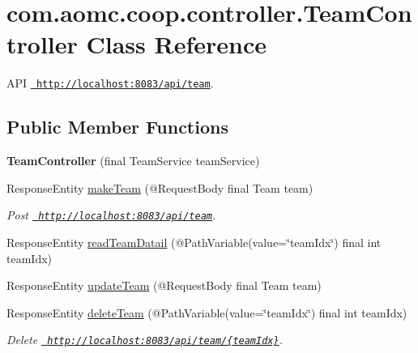 \hypertarget{classcom_1_1aomc_1_1coop_1_1controller_1_1_team_controller}{}\section{com.\+aomc.\+coop.\+controller.\+Team\+Controller Class Reference}
\label{classcom_1_1aomc_1_1coop_1_1controller_1_1_team_controller}


A\+PI \href{http://localhost:8083/api/team}{\texttt{ http\+://localhost\+:8083/api/team}}.  


\subsection*{Public Member Functions}
\begin{DoxyCompactItemize}
\item 
\mbox{\label{classcom_1_1aomc_1_1coop_1_1controller_1_1_team_controller_a128b7d4b135cf66f6615c584ca55a40a}} 
{\bfseries Team\+Controller} (final Team\+Service team\+Service)
\item 
Response\+Entity \mbox{\hyperlink{classcom_1_1aomc_1_1coop_1_1controller_1_1_team_controller_a5ffe7bc4c7dd609d828848bae014440f}{make\+Team}} (@Request\+Body final Team team)
\begin{DoxyCompactList}\small\item\em Post \href{http://localhost:8083/api/team}{\texttt{ http\+://localhost\+:8083/api/team}}. \end{DoxyCompactList}\item 
Response\+Entity \mbox{\hyperlink{classcom_1_1aomc_1_1coop_1_1controller_1_1_team_controller_a2ac70f1084366ec880a0419b791bbb26}{read\+Team\+Datail}} (@Path\+Variable(value=\char`\"{}team\+Idx\char`\"{}) final int team\+Idx)
\item 
Response\+Entity \mbox{\hyperlink{classcom_1_1aomc_1_1coop_1_1controller_1_1_team_controller_ad03a0ca2d1d0680848a5efef33934941}{update\+Team}} (@Request\+Body final Team team)
\item 
Response\+Entity \mbox{\hyperlink{classcom_1_1aomc_1_1coop_1_1controller_1_1_team_controller_ad91980399a0c2439032d93aaa5131077}{delete\+Team}} (@Path\+Variable(value=\char`\"{}team\+Idx\char`\"{}) final int team\+Idx)
\begin{DoxyCompactList}\small\item\em Delete \href{http://localhost:8083/api/team/{teamIdx}}{\texttt{ http\+://localhost\+:8083/api/team/\{team\+Idx\}}}. \end{DoxyCompactList}\item 

\end{DoxyCompactItemize}
